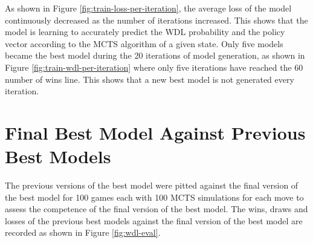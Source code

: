 As shown in Figure \ref{fig:train-loss-per-iteration}, the average loss of the model continuously decreased as the number of iterations increased. This shows that the model is learning to accurately predict the WDL probability and the policy vector according to the MCTS algorithm of a given state. Only five models became the best model during the 20 iterations of model generation, as shown in Figure \ref{fig:train-wdl-per-iteration} where only five iterations have reached the 60 number of wins line. This shows that a new best model is not generated every iteration.




\section{Final Best Model Against Previous Best Models}

The previous versions of the best model were pitted against the final version of the best model for 100 games each with 100 MCTS simulations for each move to assess the competence of the final version of the best model. The wins, draws and losses of the previous best models against the final version of the best model are recorded as shown in Figure \ref{fig:wdl-eval}.

